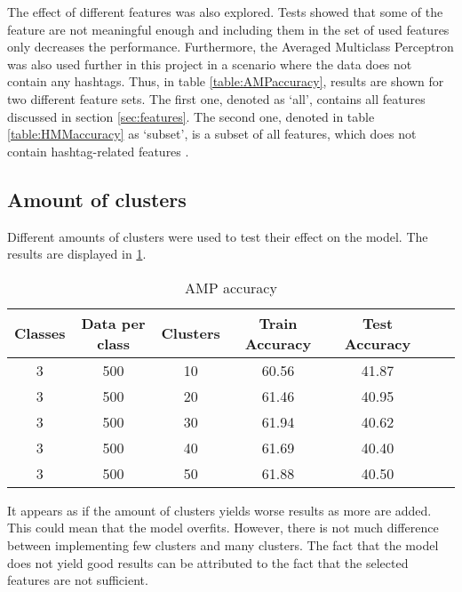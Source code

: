 The effect of different features was also explored. Tests showed that some of the feature are not meaningful enough and including them in the set of used features only decreases the performance. Furthermore, the Averaged Multiclass Perceptron was also used further in this project in a scenario where the data does not contain any hashtags. Thus, in table \ref{table:AMPaccuracy}, results are shown for two different feature sets. The first one, denoted as `all', contains all features discussed in section \ref{sec:features}.
The second one, denoted in table \ref{table:HMMaccuracy} as `subset', is a subset of all features, which does not contain hashtag-related features .

\subsection*{Amount of clusters}
Different amounts of clusters were used to test their effect on the model. The results are displayed in \ref{table:HMMclusters}.
\begin{table}[h!]
\begin{center}
\begin{tabular}{| c | c | c | c | c | c | c |}
\hline
 {\textbf{Classes}} 	 
 & {\textbf{Data per class}} 					& {\textbf{Clusters}} 
 & {\textbf{Train Accuracy}} 					& {\textbf{Test Accuracy}} 
 \\
\hline
3 	 		& 500 		& 10			& 60.56		& 41.87		\\
3 	 		& 500 		& 20			& 61.46		& 40.95		\\
3 	 		& 500 		& 30			& 61.94		& 40.62		\\
3 	 		& 500 		& 40			& 61.69		& 40.40		\\
3 	 		& 500 		& 50			& 61.88		& 40.50		\\
\hline
\end{tabular}
\caption{AMP accuracy}
\label{table:HMMclusters}
\end{center}
\end{table}

It appears as if the amount of clusters yields worse results as more are added. This could mean that the model overfits. However, there is not much difference between implementing few clusters and many clusters. The fact that the model does not yield good results can be attributed to the fact that the selected features are not sufficient. 